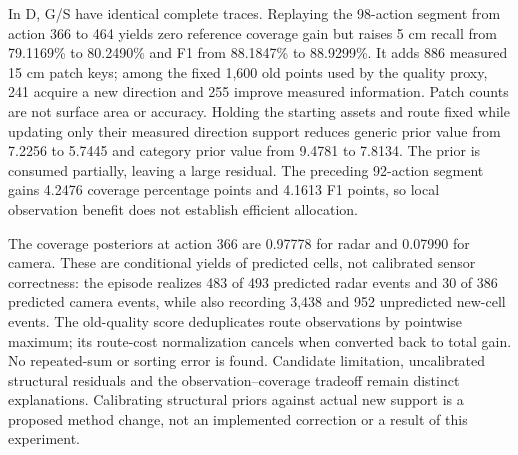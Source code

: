 In D, G/S have identical complete traces. Replaying the 98-action segment from action 366 to 464 yields zero reference coverage gain but raises 5 cm recall from 79.1169\% to 80.2490\% and F1 from 88.1847\% to 88.9299\%. It adds 886 measured 15 cm patch keys; among the fixed 1,600 old points used by the quality proxy, 241 acquire a new direction and 255 improve measured information. Patch counts are not surface area or accuracy. Holding the starting assets and route fixed while updating only their measured direction support reduces generic prior value from 7.2256 to 5.7445 and category prior value from 9.4781 to 7.8134. The prior is consumed partially, leaving a large residual. The preceding 92-action segment gains 4.2476 coverage percentage points and 4.1613 F1 points, so local observation benefit does not establish efficient allocation.

The coverage posteriors at action 366 are 0.97778 for radar and 0.07990 for camera. These are conditional yields of predicted cells, not calibrated sensor correctness: the episode realizes 483 of 493 predicted radar events and 30 of 386 predicted camera events, while also recording 3,438 and 952 unpredicted new-cell events. The old-quality score deduplicates route observations by pointwise maximum; its route-cost normalization cancels when converted back to total gain. No repeated-sum or sorting error is found. Candidate limitation, uncalibrated structural residuals and the observation--coverage tradeoff remain distinct explanations. Calibrating structural priors against actual new support is a proposed method change, not an implemented correction or a result of this experiment.
